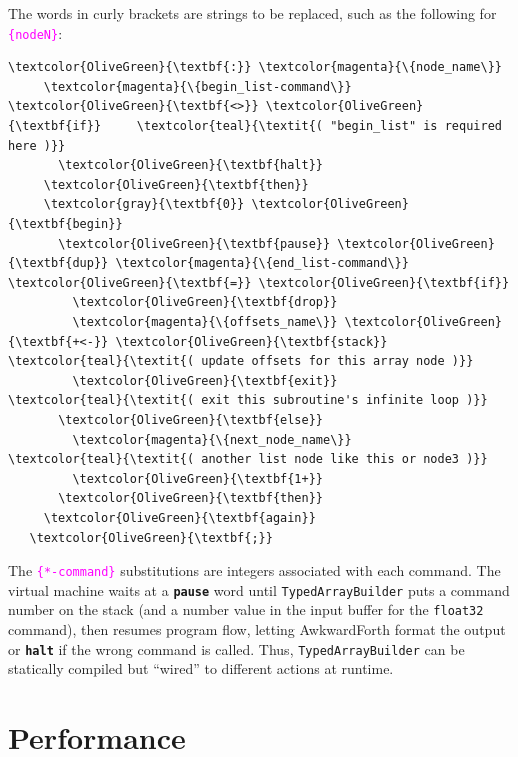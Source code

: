 \documentclass{webofc}
\begin{document}
\noindent The words in curly brackets are strings to be replaced, such as the following for \textcolor{magenta}{\tt \{nodeN\}}:

\small
\begin{Verbatim}[commandchars=\\\{\}]
   \textcolor{OliveGreen}{\textbf{:}} \textcolor{magenta}{\{node_name\}}
     \textcolor{magenta}{\{begin_list-command\}} \textcolor{OliveGreen}{\textbf{<>}} \textcolor{OliveGreen}{\textbf{if}}     \textcolor{teal}{\textit{( "begin_list" is required here )}}
       \textcolor{OliveGreen}{\textbf{halt}}
     \textcolor{OliveGreen}{\textbf{then}}
     \textcolor{gray}{\textbf{0}} \textcolor{OliveGreen}{\textbf{begin}}
       \textcolor{OliveGreen}{\textbf{pause}} \textcolor{OliveGreen}{\textbf{dup}} \textcolor{magenta}{\{end_list-command\}} \textcolor{OliveGreen}{\textbf{=}} \textcolor{OliveGreen}{\textbf{if}}
         \textcolor{OliveGreen}{\textbf{drop}}
         \textcolor{magenta}{\{offsets_name\}} \textcolor{OliveGreen}{\textbf{+<-}} \textcolor{OliveGreen}{\textbf{stack}}   \textcolor{teal}{\textit{( update offsets for this array node )}}
         \textcolor{OliveGreen}{\textbf{exit}}                       \textcolor{teal}{\textit{( exit this subroutine's infinite loop )}}
       \textcolor{OliveGreen}{\textbf{else}}
         \textcolor{magenta}{\{next_node_name\}}           \textcolor{teal}{\textit{( another list node like this or node3 )}}
         \textcolor{OliveGreen}{\textbf{1+}}
       \textcolor{OliveGreen}{\textbf{then}}
     \textcolor{OliveGreen}{\textbf{again}}
   \textcolor{OliveGreen}{\textbf{;}}
\end{Verbatim}
\normalsize

\noindent The \textcolor{magenta}{\tt \{*-command\}} substitutions are integers associated with each command. The virtual machine waits at a \textcolor{OliveGreen}{\tt\textbf{pause}} word until {\tt TypedArrayBuilder} puts a command number on the stack (and a number value in the input buffer for the {\tt float32} command), then resumes program flow, letting AwkwardForth format the output or \textcolor{OliveGreen}{\tt\textbf{halt}} if the wrong command is called. Thus, {\tt TypedArrayBuilder} can be statically compiled but ``wired'' to different actions at runtime.

\section{Performance}
\label{sec:performance}
\end{document}
